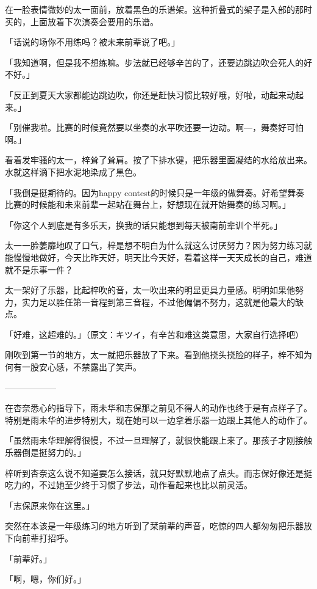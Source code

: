 \documentclass[UTF8]{ctexart}
\begin{document}
    在一脸表情微妙的太一面前，放着黑色的乐谱架。这种折叠式的架子是入部的那时买的，上面放着下次演奏会要用的乐谱。

    「话说的场你不用练吗？被未来前辈说了吧。」

    「我知道啊，但是我不想练嘛。步法就已经够辛苦的了，还要边跳边吹会死人的好不好。」

    「反正到夏天大家都能边跳边吹，你还是赶快习惯比较好哦，好啦，动起来动起来。」

    「别催我啦。比赛的时候竟然要以坐奏的水平吹还要一边动。啊—，舞奏好可怕啊。」

    看着发牢骚的太一，梓耸了耸肩。按了下排水键，把乐器里面凝结的水给放出来。水就这样滴下把水泥地染成了黑色。

    「我倒是挺期待的。因为happy contest的时候只是一年级的做舞奏。好希望舞奏比赛的时候能和未来前辈一起站在舞台上，好想现在就开始舞奏的练习啊。」

    「你这个人到底是有多乐天，换我的话只能想到每天被南前辈训个半死。」

    太一一脸萎靡地叹了口气，梓是想不明白为什么就这么讨厌努力？因为努力练习就能慢慢地做好，今天比昨天好，明天比今天好，看着这样一天天成长的自己，难道就不是乐事一件？

    太一架好了乐器，比起梓吹的音，太一吹出来的明显更具力量感。明明如果他努力，实力足以胜任第一音程到第三音程，不过他偏偏不努力，这就是他最大的缺点。

    「好难，这超难的。」（原文：キツイ，有辛苦和难这类意思，大家自行选择吧）

    刚吹到第一节的地方，太一就把乐器放了下来。看到他挠头挠脸的样子，梓不知为何有一股安心感，不禁露出了笑声。

    ——————

    在杏奈悉心的指导下，雨未华和志保那之前见不得人的动作也终于是有点样子了。特别是雨未华的进步特别大，现在她可以一边拿着乐器一边跟上其他人的动作了。

    「虽然雨未华理解得很慢，不过一旦理解了，就很快能跟上来了。那孩子才刚接触乐器倒是挺努力的。」

    梓听到杏奈这么说不知道要怎么接话，就只好默默地点了点头。而志保好像还是挺吃力的，不过她至少终于习惯了步法，动作看起来也比以前灵活。

    「志保原来你在这里。」

    突然在本该是一年级练习的地方听到了栞前辈的声音，吃惊的四人都匆匆把乐器放下向前辈打招呼。

    「前辈好。」

    「啊，嗯，你们好。」
\end{document}
